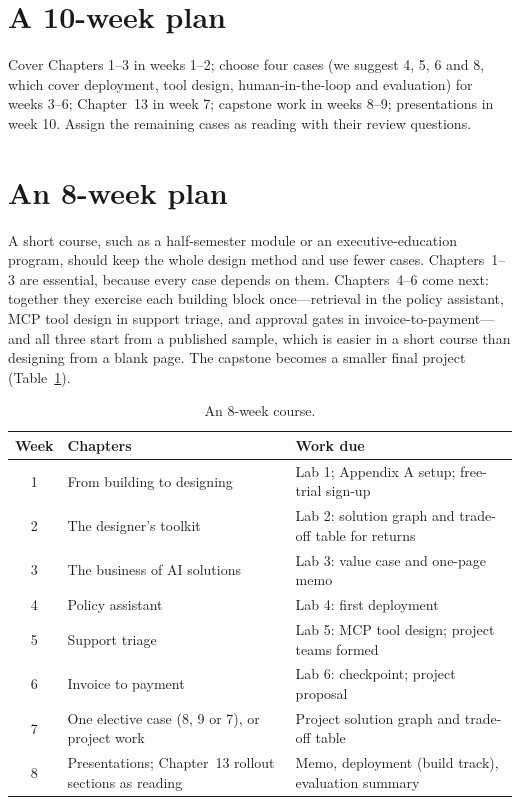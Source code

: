 \section{A 10-week plan}

Cover Chapters 1--3 in weeks 1--2; choose four cases (we suggest 4, 5, 6 and 8, which cover deployment, tool design, human-in-the-loop and evaluation) for weeks 3--6; Chapter~13 in week 7; capstone work in weeks 8--9; presentations in week 10. Assign the remaining cases as reading with their review questions.

\section{An 8-week plan}

A short course, such as a half-semester module or an executive-education program, should keep the whole design method and use fewer cases. Chapters~1--3 are essential, because every case depends on them. Chapters~4--6 come next: together they exercise each building block once---retrieval in the policy assistant, MCP tool design in support triage, and approval gates in invoice-to-payment---and all three start from a published sample, which is easier in a short course than designing from a blank page. The capstone becomes a smaller final project (Table~\ref{tab:course8}).

\begin{table}[htbp]
\centering
\small
\caption{An 8-week course.}
\label{tab:course8}
\begin{tabularx}{\textwidth}{@{}c>{\raggedright\arraybackslash}p{3.8cm}>{\raggedright\arraybackslash}X@{}}
\toprule
Week & Chapters & Work due \\
\midrule
1 & 1 From building to designing & Lab 1; Appendix A setup; free-trial sign-up \\
2 & 2 The designer's toolkit & Lab 2: solution graph and trade-off table for returns \\
3 & 3 The business of AI solutions & Lab 3: value case and one-page memo \\
4 & 4 Policy assistant & Lab 4: first deployment \\
5 & 5 Support triage & Lab 5: MCP tool design; project teams formed \\
6 & 6 Invoice to payment & Lab 6: checkpoint; project proposal \\
7 & One elective case (8, 9 or 7), or project work & Project solution graph and trade-off table \\
8 & Presentations; Chapter~13 rollout sections as reading & Memo, deployment (build track), evaluation summary \\
\bottomrule
\end{tabularx}
\end{table}

